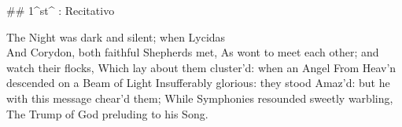 ## 1^st^ \mvmt: Recitativo

\beginnumbering
\pstart
The Night was dark and silent; when Lycidas \\
And Corydon, both faithful Shepherds met,
As wont to meet each other; and watch their flocks,
Which lay about them cluster’d: when an Angel
From Heav’n descended on a Beam of Light
Insufferably glorious: they stood
Amaz’d: but he with this message chear’d them;
While Symphonies resounded sweetly warbling,
The Trump of God preluding to his Song.
\pend
\endnumbering
